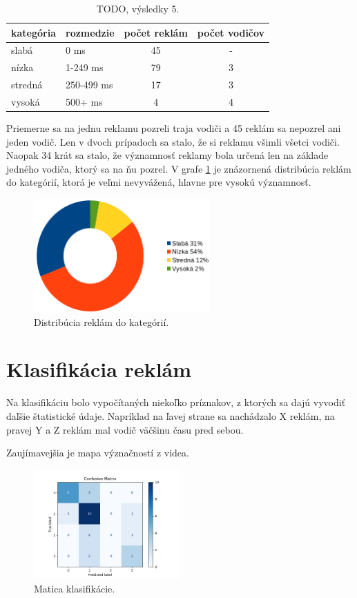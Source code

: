 \begin{table}[ht]
\centering
\begin{tabular}{|l l c c|}
 \hline
 kategória &	rozmedzie &	počet reklám &	počet vodičov \\ [0.5ex]
 \hline
slabá &	0 ms &	45 &	- \\ [0.1ex]
nízka &	1-249 ms &	79 &	3 \\ [0.1ex]
stredná &	250-499 ms &	17 &	3 \\ [0.1ex]
vysoká &	500+ ms &	4 &	4 \\ [0.1ex]
 \hline
\end{tabular}
\caption{TODO, výsledky 5.}
\label{table:cat}
\end{table}

Priemerne sa na jednu reklamu pozreli traja vodiči a 45 reklám sa nepozrel ani jeden vodič. Len v dvoch prípadoch sa stalo, že si reklamu všimli všetci vodiči. Naopak 34 krát sa stalo, že významnosť reklamy bola určená len na základe jedného vodiča, ktorý sa na ňu pozrel. V grafe \ref{img:chart} je znázornená distribúcia reklám do kategórií, ktorá je veľmi nevyvážená, hlavne pre vysokú významnosť.

\begin{figure}[ht]
    \centering
    \includegraphics[width=0.6\textwidth]{images/05/chart.png}
    \caption{Distribúcia reklám do kategórií.}
    \label{img:chart}
\end{figure}

\section{Klasifikácia reklám}

Na klasifikáciu bolo vypočítaných niekoľko príznakov, z ktorých sa dajú vyvodiť daľšie štatistické údaje. Napríklad na ľavej strane sa nachádzalo X reklám, na pravej Y a Z reklám mal vodič väčšinu času pred sebou.

Zaujímavejšia je mapa význačností z videa.

\begin{figure}[ht]
    \centering
    \includegraphics[width=0.5\textwidth]{images/05/rfc.png}
    \caption{Matica klasifikácie.}
    \label{img:road}
\end{figure}

